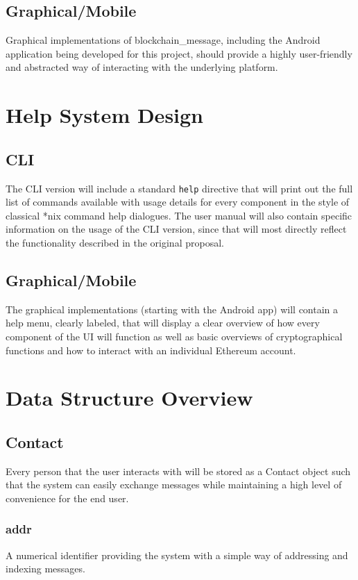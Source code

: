 \documentclass[titlepage]{report}
\begin{document}
\subsection{Graphical/Mobile}
Graphical implementations of blockchain\_message, including the Android application being developed for this project, should provide a highly user-friendly and abstracted way of interacting with the underlying platform.

\section{Help System Design}

\subsection{CLI}
The CLI version will include a standard \verb|help| directive that will print out the full list of commands available with usage details for every component in the style of classical *nix command help dialogues. The user manual will also contain specific information on the usage of the CLI version, since that will most directly reflect the functionality described in the original proposal.

\subsection{Graphical/Mobile}
The graphical implementations (starting with the Android app) will contain a help menu, clearly labeled, that will display a clear overview of how every component of the UI will function as well as basic overviews of cryptographical functions and how to interact with an individual \gls{Ethereum} account.

\section{Data Structure Overview}
\subsection{Contact}
Every person that the user interacts with will be stored as a Contact object such that the system can easily exchange messages while maintaining a high level of convenience for the end user.

\subsubsection{addr}
A numerical identifier providing the system with a simple way of addressing and indexing messages.
\end{document}
